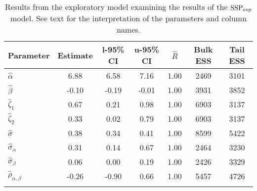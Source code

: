 \begin{table}

\caption{Results from the exploratory model examining the results of the $\operatorname{SSP}_{\text{exp}}$ model. \label{tab:the exploratory-SSP}See text for the interpretation of the parameters and column names.}

\begin{tabular}{l *3{S[table-format=-1.2]} S[table-format=1.2] *2{S[table-format=5.0]}}
\lsptoprule
Parameter & {Estimate} & {l-95\% CI} & {u-95\% CI} & {$\hat{R}$} & {Bulk ESS} & {Tail ESS}\\
\midrule
$\hat\alpha$ & 6.88 & 6.58 & 7.16 & 1.00 & 2469 & 3101\\
$\hat\beta$ & -0.10 & -0.19 & -0.01 & 1.00 & 3931 & 3852\\
$\hat\zeta_{1}$ & 0.67 & 0.21 & 0.98 & 1.00 & 6903 & 3137\\
$\hat\zeta_{2}$ & 0.33 & 0.02 & 0.79 & 1.00 & 6903 & 3137\\
$\hat\sigma$ & 0.38 & 0.34 & 0.41 & 1.00 & 8599 & 5422\\
$\hat\sigma_{\alpha}$ & 0.31 & 0.14 & 0.67 & 1.00 & 2464 & 3230\\
$\hat\sigma_{\beta}$ & 0.06 & 0.00 & 0.19 & 1.00 & 2426 & 3329\\
$\hat\rho_{\alpha,\beta}$ & -0.26 & -0.90 & 0.66 & 1.00 & 5457 & 4726\\
\lspbottomrule
\end{tabular}

\end{table}






